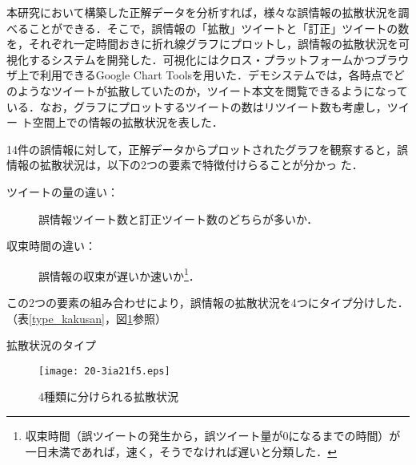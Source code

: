 \documentclass[japanese]{jnlp_1.4}
\begin{document}
本研究において構築した正解データを分析すれば，様々な誤情報の拡散状況を調
べることができる．そこで，誤情報の「拡散」ツイートと「訂正」ツイートの数
を，それぞれ一定時間おきに折れ線グラフにプロットし，誤情報の拡散状況を可
視化するシステムを開発した．可視化にはクロス・プラットフォームかつブラウ
ザ上で利用できるGoogle Chart Toolsを用いた．デモシステムでは，各時点でど
のようなツイートが拡散していたのか，ツイート本文を閲覧できるようになって
いる．なお，グラフにプロットするツイートの数はリツイート数も考慮し，ツイー
ト空間上での情報の拡散状況を表した．

14件の誤情報に対して，正解データからプロットされたグラフを観察すると，誤
情報の拡散状況は，以下の2つの要素で特徴付けらることが分かっ
た．
\begin{description}
\item[ツイートの量の違い：] 誤情報ツイート数と訂正ツイート数のどちらが多いか．
\item[収束時間の違い：] 誤情報の収束が遅いか速いか\footnote{収束時間（誤ツイートの発生から，誤ツイート量が0になるまでの時間）が一日未満であれば，速く，そうでなければ遅いと分類した．}．
\end{description}
この2つの要素の組み合わせにより，誤情報の拡散状況を4つにタイプ分けした．
（表\ref{type_kakusan}，図\ref{fig:four-kakusan}参照）

\begin{table}[t]
 \caption{拡散状況のタイプ}
 \label{type_kakusan}

\end{table}

\begin{figure}[t]
\begin{center}
  \texttt{[image: 20-3ia21f5.eps]}
\end{center}
\caption{4種類に分けられる拡散状況}
\label{fig:four-kakusan}
\end{figure}
\end{document}
